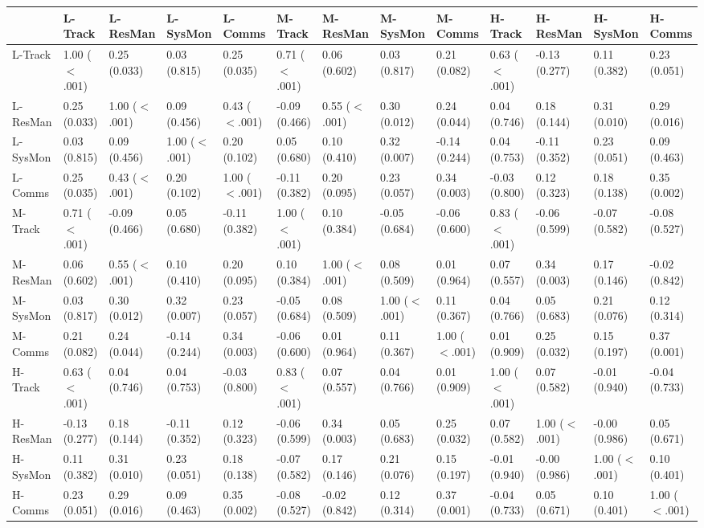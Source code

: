 \begin{tabular}{lllllllllllll}
\toprule
 & L-Track & L-ResMan & L-SysMon & L-Comms & M-Track & M-ResMan & M-SysMon & M-Comms & H-Track & H-ResMan & H-SysMon & H-Comms \\
\midrule
L-Track & 1.00 ($<$.001) & 0.25 (0.033) & 0.03 (0.815) & 0.25 (0.035) & 0.71 ($<$.001) & 0.06 (0.602) & 0.03 (0.817) & 0.21 (0.082) & 0.63 ($<$.001) & -0.13 (0.277) & 0.11 (0.382) & 0.23 (0.051) \\
L-ResMan & 0.25 (0.033) & 1.00 ($<$.001) & 0.09 (0.456) & 0.43 ($<$.001) & -0.09 (0.466) & 0.55 ($<$.001) & 0.30 (0.012) & 0.24 (0.044) & 0.04 (0.746) & 0.18 (0.144) & 0.31 (0.010) & 0.29 (0.016) \\
L-SysMon & 0.03 (0.815) & 0.09 (0.456) & 1.00 ($<$.001) & 0.20 (0.102) & 0.05 (0.680) & 0.10 (0.410) & 0.32 (0.007) & -0.14 (0.244) & 0.04 (0.753) & -0.11 (0.352) & 0.23 (0.051) & 0.09 (0.463) \\
L-Comms & 0.25 (0.035) & 0.43 ($<$.001) & 0.20 (0.102) & 1.00 ($<$.001) & -0.11 (0.382) & 0.20 (0.095) & 0.23 (0.057) & 0.34 (0.003) & -0.03 (0.800) & 0.12 (0.323) & 0.18 (0.138) & 0.35 (0.002) \\
M-Track & 0.71 ($<$.001) & -0.09 (0.466) & 0.05 (0.680) & -0.11 (0.382) & 1.00 ($<$.001) & 0.10 (0.384) & -0.05 (0.684) & -0.06 (0.600) & 0.83 ($<$.001) & -0.06 (0.599) & -0.07 (0.582) & -0.08 (0.527) \\
M-ResMan & 0.06 (0.602) & 0.55 ($<$.001) & 0.10 (0.410) & 0.20 (0.095) & 0.10 (0.384) & 1.00 ($<$.001) & 0.08 (0.509) & 0.01 (0.964) & 0.07 (0.557) & 0.34 (0.003) & 0.17 (0.146) & -0.02 (0.842) \\
M-SysMon & 0.03 (0.817) & 0.30 (0.012) & 0.32 (0.007) & 0.23 (0.057) & -0.05 (0.684) & 0.08 (0.509) & 1.00 ($<$.001) & 0.11 (0.367) & 0.04 (0.766) & 0.05 (0.683) & 0.21 (0.076) & 0.12 (0.314) \\
M-Comms & 0.21 (0.082) & 0.24 (0.044) & -0.14 (0.244) & 0.34 (0.003) & -0.06 (0.600) & 0.01 (0.964) & 0.11 (0.367) & 1.00 ($<$.001) & 0.01 (0.909) & 0.25 (0.032) & 0.15 (0.197) & 0.37 (0.001) \\
H-Track & 0.63 ($<$.001) & 0.04 (0.746) & 0.04 (0.753) & -0.03 (0.800) & 0.83 ($<$.001) & 0.07 (0.557) & 0.04 (0.766) & 0.01 (0.909) & 1.00 ($<$.001) & 0.07 (0.582) & -0.01 (0.940) & -0.04 (0.733) \\
H-ResMan & -0.13 (0.277) & 0.18 (0.144) & -0.11 (0.352) & 0.12 (0.323) & -0.06 (0.599) & 0.34 (0.003) & 0.05 (0.683) & 0.25 (0.032) & 0.07 (0.582) & 1.00 ($<$.001) & -0.00 (0.986) & 0.05 (0.671) \\
H-SysMon & 0.11 (0.382) & 0.31 (0.010) & 0.23 (0.051) & 0.18 (0.138) & -0.07 (0.582) & 0.17 (0.146) & 0.21 (0.076) & 0.15 (0.197) & -0.01 (0.940) & -0.00 (0.986) & 1.00 ($<$.001) & 0.10 (0.401) \\
H-Comms & 0.23 (0.051) & 0.29 (0.016) & 0.09 (0.463) & 0.35 (0.002) & -0.08 (0.527) & -0.02 (0.842) & 0.12 (0.314) & 0.37 (0.001) & -0.04 (0.733) & 0.05 (0.671) & 0.10 (0.401) & 1.00 ($<$.001) \\
\bottomrule
\end{tabular}
